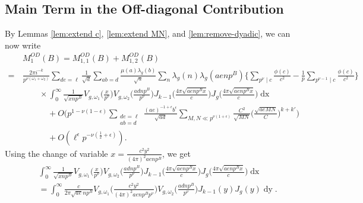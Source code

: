 \documentclass[12pt]{amsart}
\theoremstyle{plain}
\theoremstyle{definition}
\begin{document}



\subsection{Main Term in the Off-diagonal Contribution}\label{sec:main term OD}

By Lemmas \ref{lem:extend c}, \ref{lem:extend MN}, and \ref{lem:remove-dyadic}, we can now write   \begin{equation}\label{eq:M1OD setup}
    \begin{split}
    &M^{OD}_1(B) = M^{OD}_{1, 1}(B)+M^{OD}_{1, 2}(B)
    \\
    = \, & \frac{2\pi i^{-k}}{p^{\nu(\omega_1+\omega_2)}}
    \sum_{de=\ell}
    \frac{1}{\sqrt d}
    \sum_{ab=d}  \frac{\mu(a) \lambda_g(b)}{\sqrt{a}}
    \sum_n  \lambda_g(n)  \lambda_g(aenp^B)
    \Big\{\sum_{p^\nu \mid c} \frac{\phi(c)}{c^2}
    -\frac{1}{p} \sum_{p^{\nu-1} \mid c} \frac{\phi(c)}{c^2}\Big\}
    \\
    &\hspace{2em} \times \int_0^\infty \frac{1}{\sqrt{xnp^B}}
    V_{g, \omega_1}\Big(\frac{x}{p^\nu }\Big)
    V_{g, \omega_2}\Big(\frac{adnp^B}{p^\nu }\Big)
        J_{k-1}\Big(\frac{4\pi \sqrt{aenp^B x}}{c}\Big)
        J_{g}\Big(\frac{4\pi \sqrt{aenp^B x}}{c}\Big)
        \mathop{dx} \\
        &\hspace{3em}+ O\bigg(p^{1-\nu(1-\epsilon)}
    \sum_{\substack{de=\ell\\ab=d}}  \frac{(ae)^{-1+\epsilon}b^{\epsilon}}{\sqrt{ad}}\sum_{M,N\ll p^{\nu(1+\epsilon)}}\frac{C^2}{\sqrt{MN}}\Big(\frac{\sqrt{aeMN}}{C}\Big)^{k+k'}\bigg)\\&\hspace{3em}+O\left(\ell^{\epsilon}p^{-\nu\left(\frac{1}{2}+\epsilon\right)}\right).
    \end{split}
    \end{equation}    
Using the change of variable
$x=\frac{c^2y^2}{(4\pi)^2 a e np^B}$, we get
    \begin{align*}
  & \int_0^\infty \frac{1}{\sqrt{xnp^B}}
   V_{g, \omega_1}\Big(\frac{x}{p^\nu}\Big)
   V_{g, \omega_2}\Big(\frac{adnp^B}{p^\nu}\Big)
    J_{k-1}\Big(\frac{4\pi \sqrt{aenp^Bx}}{c}\Big)
    J_{g}\Big(\frac{4\pi \sqrt{aenp^B x}}{c}\Big) \mathop{dx}
\\&=    \int_0^\infty 
  \frac{c} {2\pi \sqrt{ae} np^B}  
   V_{g, \omega_1}\Big(\frac{c^2y^2}{(4\pi)^2 ae np^B p^\nu }\Big) 
  V_{g, \omega_2}\Big(\frac{adnp^B}{p^\nu }\Big)
    J_{k-1}(y) 
    J_g( y) \mathop{dy} .
    \end{align*} 
\end{document}
